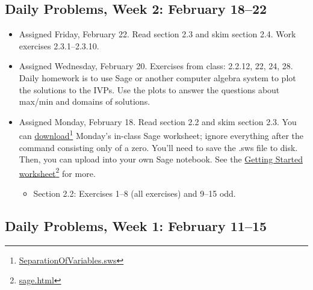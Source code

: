 \subsection{Daily Problems, Week 2: February 18--22}
\label{dailyproblemsweek2:february18--22}

\begin{itemize}
\item Assigned Friday, February 22. Read section 2.3 and skim section 2.4. Work exercises 2.3.1--2.3.10.

\item Assigned Wednesday, February 20. Exercises from class: 2.2.12, 22, 24, 28. Daily homework is to use Sage or another computer algebra system to plot the solutions to the IVPs. Use the plots to answer the questions about max\slash min and domains of solutions.

\item Assigned Monday, February 18. Read section 2.2 and skim section 2.3. You can \href{SeparationOfVariables.sws}{download}\footnote{\href{SeparationOfVariables.sws}{SeparationOfVariables.sws}} Monday's in-class Sage worksheet; ignore everything after the command consisting only of a zero. You'll need to save the .sws file to disk. Then, you can upload into your own Sage notebook. See the \href{sage.html}{Getting Started worksheet}\footnote{\href{sage.html}{sage.html}} for more.

\begin{itemize}
\item Section 2.2: Exercises 1--8 (all exercises) and 9--15 odd.

\end{itemize}

\end{itemize}

\subsection{Daily Problems, Week 1: February 11--15}
\label{dailyproblemsweek1:february11--15}

